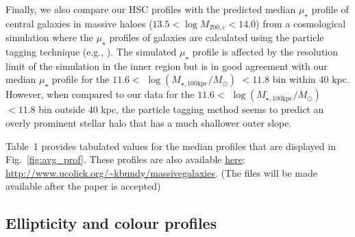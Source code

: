 \documentclass[fleqn,usenatbib]{mnras}
\def\logmtot{{$\log (M_{\star,100\mathrm{kpc}}/M_{\odot})$}}
\def\mden{{$\mu_{\star}$}}
\begin{document}
    Finally, we also compare our HSC profiles with the predicted median \mden{} 
    profile of central galaxies in massive haloes ($13.5 < \log M_{200,c} < 14.0$) 
    from a cosmological simulation where the \mden{} profiles of galaxies are 
    calculated using the particle tagging technique (e.g., \citealt{Cooper2010}). 
    The simulated \mden{} profile is affected by the resolution limit of the 
    simulation in the inner region but is in good agreement with our median 
    \mden{} profile for the $11.6 <$ \logmtot{} $< 11.8$ bin within 40 kpc. 
    However, when compared to our data for the $11.6 <$ \logmtot{} $< 11.8$ bin 
    outside 40 kpc, the particle tagging method seems to predict an overly  
    prominent stellar halo that has a much shallower outer slope. 
    
    Table~1 provides tabulated values for the median profiles that are 
    displayed in Fig.~\ref{fig:avg_prof}. 
    These profiles are also available  
    \href{http://www.ucolick.org/\~kbundy/massivegalaxies}{here}:
    {\url{http://www.ucolick.org/\~kbundy/massivegalaxies}}. 
    (The files will be made available after the paper is accepted)
    

\subsection{Ellipticity and colour profiles}
    \label{ssec:ell_color}
    
\end{document}
